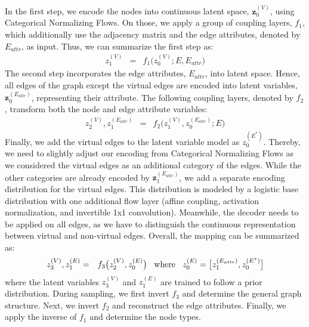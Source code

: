 In the first step, we encode the nodes into continuous latent space, $\bm{z}_0^{(V)}$, using Categorical Normalizing Flows. On those, we apply a group of coupling layers, $f_1$, which additionally use the adjacency matrix and the edge attributes, denoted by $E_{attr}$, as input. Thus, we can summarize the first step as:
\begin{eqnarray}
    z_{1}^{(V)} & = & f_1\big(z_{0}^{(V)}; E, E_{attr}\big)
\end{eqnarray}
The second step incorporates the edge attributes, $E_{attr}$, into latent space. Hence, all edges of the graph except the virtual edges are encoded into latent variables, $\bm{z}_0^{(E_{attr})}$, representing their attribute. The following coupling layers, denoted by $f_2$, transform both the node and edge attribute variables:
\begin{eqnarray}
    z_{2}^{(V)}, z_{1}^{(E_{attr})} & = & f_2\big(z_{1}^{(V)}, z_{0}^{(E_{attr})}; E\big)
\end{eqnarray}
Finally, we add the virtual edges to the latent variable model as $z_{0}^{(E^*)}$. Thereby, we need to slightly adjust our encoding from Categorical Normalizing Flows as we considered the virtual edges as an additional category of the edges. 
While the other categories are already encoded by $\bm{z}_{1}^{(E_{attr})}$, we add a separate encoding distribution for the virtual edges.
This distribution is modeled by a logistic base distribution with one additional flow layer (affine coupling, activation normalization, and invertible 1x1 convolution).
Meanwhile, the decoder needs to be applied on all edges, as we have to distinguish the continuous representation between virtual and non-virtual edges. 
Overall, the mapping can be summarized as:
\begin{eqnarray}
    z_{3}^{(V)}, z_{1}^{(E)} & = & f_3\big(z_{2}^{(V)}, z_{0}^{(E)}\big)\hspace{3mm}\text{where}\hspace{3mm}z_{0}^{(E)} = \big[z_{1}^{(E_{attr})}, z_{0}^{(E^*)}\big]
\end{eqnarray}
where the latent variables $z_{3}^{(V)}$ and $z_{1}^{(E)}$ are trained to follow a prior distribution. 
During sampling, we first invert $f_3$ and determine the general graph structure. Next, we invert $f_2$ and reconstruct the edge attributes. Finally, we apply the inverse of $f_1$ and determine the node types. 


